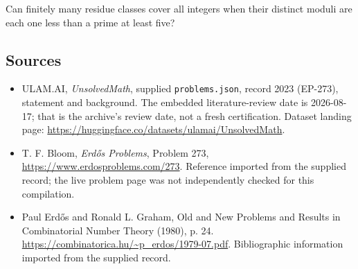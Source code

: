 \documentclass[11pt,a4paper]{article}
\begin{document}
Can finitely many residue classes cover all integers when their distinct moduli are each one less than a prime at least five?

\subsection{Sources}

{\small

\begin{itemize}

\item[\hypertarget{source:2023:1}{S1}] ULAM.AI, \emph{UnsolvedMath}, supplied \texttt{problems.json}, record 2023 (EP-273), statement and background. The embedded literature-review date is 2026-08-17; that is the archive’s review date, not a fresh certification. Dataset landing page: \url{https://huggingface.co/datasets/ulamai/UnsolvedMath}.

\item[\hypertarget{source:2023:2}{S2}] T. F. Bloom, \emph{Erdős Problems}, Problem 273, \url{https://www.erdosproblems.com/273}. Reference imported from the supplied record; the live problem page was not independently checked for this compilation.

\item[\hypertarget{source:2023:3}{S3}] Paul Erdős and Ronald L. Graham, Old and New Problems and Results in Combinatorial Number Theory (1980), p. 24. \url{https://combinatorica.hu/~p_erdos/1979-07.pdf}. Bibliographic information imported from the supplied record.

\end{itemize}

}

\label{end:2023}
\end{document}
